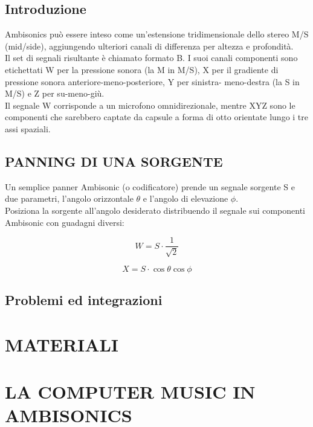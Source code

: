   \section{Introduzione}
Ambisonics può essere inteso come un'estensione tridimensionale dello stereo M/S (mid/side),
aggiungendo ulteriori canali di differenza per altezza e profondità.\\
Il set di segnali risultante è chiamato formato B.
I suoi canali componenti sono etichettati W per la pressione sonora (la M in M/S),
X per il gradiente di pressione sonora anteriore-meno-posteriore, 
Y per sinistra- meno-destra (la S in M/S) e Z per su-meno-giù. \\
Il segnale W corrisponde a un microfono omnidirezionale,
mentre XYZ sono le componenti che sarebbero captate da
capsule a forma di otto orientate lungo i tre assi spaziali.

\section{PANNING DI UNA SORGENTE}
Un semplice panner Ambisonic (o codificatore) prende un segnale sorgente S e due parametri,
 l'angolo orizzontale $\theta$ e l'angolo di elevazione $\phi$.\\
 Posiziona la sorgente all'angolo desiderato distribuendo il segnale sui 
 componenti Ambisonic con guadagni diversi:

 \begin{equation}
W =S\cdot\frac{1}{\sqrt{2}}
 \end{equation}

 \begin{equation}
      X=S\cdot\cos\theta\cos\phi
\end{equation}

\section{Problemi ed integrazioni}

\chapter{MATERIALI}
\label{chp:Materiali}

\chapter{LA COMPUTER MUSIC IN AMBISONICS}
\label{chp:La computer music in Ambisonics}

